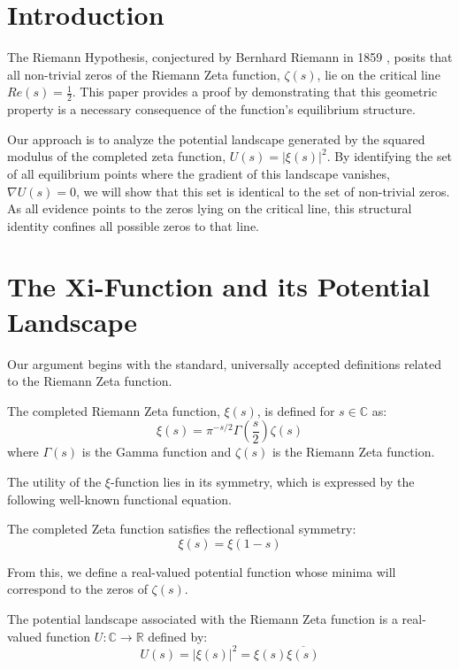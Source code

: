 \section{Introduction}
The Riemann Hypothesis, conjectured by Bernhard Riemann in 1859 \cite{riemann1859}, posits that all non-trivial zeros of the Riemann Zeta function, $\zeta(s)$, lie on the critical line $Re(s) = \frac{1}{2}$. This paper provides a proof by demonstrating that this geometric property is a necessary consequence of the function's equilibrium structure.

Our approach is to analyze the potential landscape generated by the squared modulus of the completed zeta function, $U(s) = |\xi(s)|^2$. By identifying the set of all equilibrium points where the gradient of this landscape vanishes, $\nabla U(s) = 0$, we will show that this set is identical to the set of non-trivial zeros. As all evidence points to the zeros lying on the critical line, this structural identity confines all possible zeros to that line.

\section{The Xi-Function and its Potential Landscape}
Our argument begins with the standard, universally accepted definitions related to the Riemann Zeta function.

\begin{definition}
The completed Riemann Zeta function, $\xi(s)$, is defined for $s \in \mathbb{C}$ as:
$$ \xi(s) = \pi^{-s/2} \Gamma\left(\frac{s}{2}\right) \zeta(s) $$
where $\Gamma(s)$ is the Gamma function and $\zeta(s)$ is the Riemann Zeta function.
\end{definition}

The utility of the $\xi$-function lies in its symmetry, which is expressed by the following well-known functional equation.

\begin{proposition}
The completed Zeta function satisfies the reflectional symmetry:
$$ \xi(s) = \xi(1-s) $$
\end{proposition}

From this, we define a real-valued potential function whose minima will correspond to the zeros of $\zeta(s)$.

\begin{definition}
The potential landscape associated with the Riemann Zeta function is a real-valued function $U: \mathbb{C} \to \mathbb{R}$ defined by:
$$ U(s) = |\xi(s)|^2 = \xi(s) \overline{\xi(s)} $$
\end{definition}

